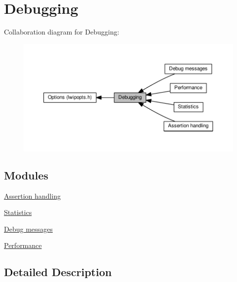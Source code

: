 \hypertarget{group__lwip__opts__debug}{}\section{Debugging}
\label{group__lwip__opts__debug}
Collaboration diagram for Debugging\+:
\nopagebreak
\begin{figure}[H]
\begin{center}
\leavevmode
\includegraphics[width=350pt]{group__lwip__opts__debug}
\end{center}
\end{figure}
\subsection*{Modules}
\begin{DoxyCompactItemize}
\item 
\hyperlink{group__lwip__assertions}{Assertion handling}
\item 
\hyperlink{group__lwip__opts__stats}{Statistics}
\item 
\hyperlink{group__lwip__opts__debugmsg}{Debug messages}
\item 
\hyperlink{group__lwip__opts__perf}{Performance}
\end{DoxyCompactItemize}


\subsection{Detailed Description}
